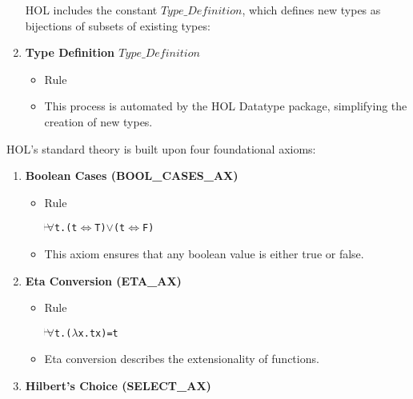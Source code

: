 \begin{enumerate}
HOL includes the constant \(Type\_Definition\), which defines new types as bijections of subsets of existing types:
    \item \textbf{Type Definition \(Type\_Definition\)}
    \begin{itemize}
        \item Rule
        \item This process is automated by the HOL Datatype package, simplifying the creation of new types.

    \end{itemize}


\end{enumerate}

HOL’s standard theory is built upon four foundational axioms:
\begin{enumerate}
    \item \textbf{Boolean Cases (BOOL\_CASES\_AX)}
    \begin{itemize}
        \item Rule
          \begin{alltt}
            \(\!\!\!{\turn}\!\!\!\!\) \(\forall\)t. (t \({\Leftrightarrow}\) T) \(\lor\) (t \({\Leftrightarrow}\) F)
          \end{alltt}
        \item This axiom ensures that any boolean value is either true or false.
    \end{itemize}

    \item \textbf{Eta Conversion (ETA\_AX)}
    \begin{itemize}
        \item Rule
          \begin{alltt}
            \(\!\!\!{\turn}\!\!\!\!\) \(\forall\)t. (\(\lambda\)x. t x) = t
          \end{alltt}
        \item Eta conversion describes the extensionality of functions.
    \end{itemize}

    \item \textbf{Hilbert’s Choice (SELECT\_AX)}


\end{enumerate}
